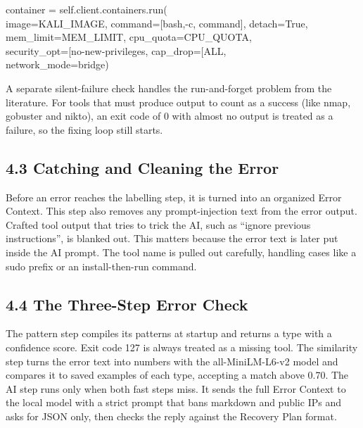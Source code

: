 \documentclass[
]{article}
\begin{document}
container = self.client.containers.run(\\
image=KALI\_IMAGE,
command={[}\textquotesingle bash\textquotesingle,\textquotesingle-c\textquotesingle,
command{]}, detach=True,\\
mem\_limit=MEM\_LIMIT, cpu\_quota=CPU\_QUOTA,\\
security\_opt={[}\textquotesingle no-new-privileges\textquotesingle{]},
cap\_drop={[}\textquotesingle ALL\textquotesingle{]},\\
network\_mode=\textquotesingle bridge\textquotesingle)

A separate silent-failure check handles the run-and-forget problem from
the literature. For tools that must produce output to count as a success
(like nmap, gobuster and nikto), an exit code of 0 with almost no output
is treated as a failure, so the fixing loop still starts.

\hypertarget{catching-and-cleaning-the-error}{%
\subsection{4.3 Catching and Cleaning the
Error}\label{catching-and-cleaning-the-error}}

Before an error reaches the labelling step, it is turned into an
organized Error Context. This step also removes any prompt-injection
text from the error output. Crafted tool output that tries to trick the
AI, such as ``ignore previous instructions'', is blanked out. This
matters because the error text is later put inside the AI prompt. The
tool name is pulled out carefully, handling cases like a sudo prefix or
an install-then-run command.

\hypertarget{the-three-step-error-check-1}{%
\subsection{4.4 The Three-Step Error
Check}\label{the-three-step-error-check-1}}

The pattern step compiles its patterns at startup and returns a type
with a confidence score. Exit code 127 is always treated as a missing
tool. The similarity step turns the error text into numbers with the
all-MiniLM-L6-v2 model and compares it to saved examples of each type,
accepting a match above 0.70. The AI step runs only when both fast steps
miss. It sends the full Error Context to the local model with a strict
prompt that bans markdown and public IPs and asks for JSON only, then
checks the reply against the Recovery Plan format.
\end{document}
